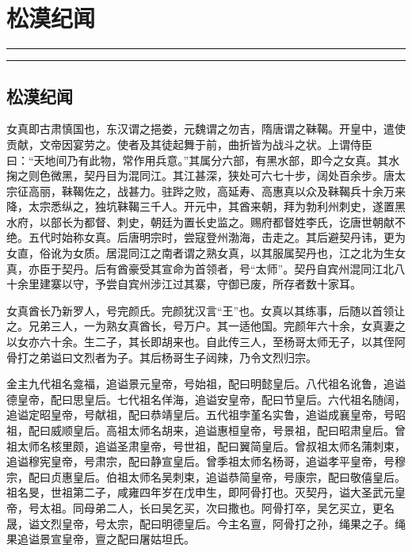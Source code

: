 \documentclass[]{article}
\date{}
\begin{document}
\hypertarget{header-n0}{%
\section{松漠纪闻}\label{header-n0}}

\begin{center}\rule{0.5\linewidth}{\linethickness}\end{center}

\tableofcontents

\begin{center}\rule{0.5\linewidth}{\linethickness}\end{center}

\hypertarget{header-n10}{%
\subsection{松漠纪闻}\label{header-n10}}

女真即古肃慎国也，东汉谓之挹娄，元魏谓之勿吉，隋唐谓之靺鞨。开皇中，遣使贡献，文帝因宴劳之。使者及其徒起舞于前，曲折皆为战斗之状。上谓侍臣曰：``天地间乃有此物，常作用兵意。''其属分六部，有黑水部，即今之女真。其水掬之则色微黑，契丹目为混同江。其江甚深，狭处可六七十步，阔处百余步。唐太宗征高丽，靺鞨佐之，战甚力。驻跸之败，高延寿、高惠真以众及靺鞨兵十余万来降，太宗悉纵之，独坑靺鞨三千人。开元中，其酋来朝，拜为勃利州刺史，遂置黑水府，以部长为都督、刺史，朝廷为置长史监之。赐府都督姓李氏，讫唐世朝献不绝。五代时始称女真。后唐明宗时，尝寇登州渤海，击走之。其后避契丹讳，更为女直，俗讹为女质。居混同江之南者谓之熟女真，以其服属契丹也，江之北为生女真，亦臣于契丹。后有酋豪受其宣命为首领者，号``太师''。契丹自宾州混同江北八十余里建寨以守，予尝自宾州涉江过其寨，守御已废，所存者数十家耳。

女真酋长乃新罗人，号完颜氏。完颜犹汉言``王''也。女真以其练事，后随以首领让之。兄弟三人，一为熟女真酋长，号万户。其一适他国。完颜年六十余，女真妻之以女亦六十余。生二子，其长即胡来也。自此传三人，至杨哥太师无子，以其侄阿骨打之弟谥曰文烈者为子。其后杨哥生子闼辣，乃令文烈归宗。

金主九代祖名龛福，追谥景元皇帝，号始祖，配曰明懿皇后。八代祖名讹鲁，追谥德皇帝，配曰思皇后。七代祖名佯海，追谥安皇帝，配曰节皇后。六代祖名随阔，追谥定昭皇帝，号献祖，配曰恭靖皇后。五代祖孛堇名实鲁，追谥成襄皇帝，号昭祖，配曰威顺皇后。高祖太师名胡来，追谥惠桓皇帝，号景祖，配曰昭肃皇后。曾祖太师名核里颇，追谥圣肃皇帝，号世祖，配曰翼简皇后。曾叔祖太师名蒲刺束，追谥穆宪皇帝，号肃宗，配曰静宣皇后。曾季祖太师名杨哥，追谥孝平皇帝，号穆宗，配曰贞惠皇后。伯祖太师名吴刺束，追谥恭简皇帝，号康宗，配曰敬僖皇后。祖名旻，世祖第二子，咸雍四年岁在戊申生，即阿骨打也。灭契丹，谥大圣武元皇帝，号太祖。同母弟二人，长曰吴乞买，次曰撒也。阿骨打卒，吴乞买立，更名晟，谥文烈皇帝，号太宗，配曰明德皇后。今主名亶，阿骨打之孙，绳果之子。绳果追谥景宣皇帝，亶之配曰屠姑坦氏。
\end{document}
